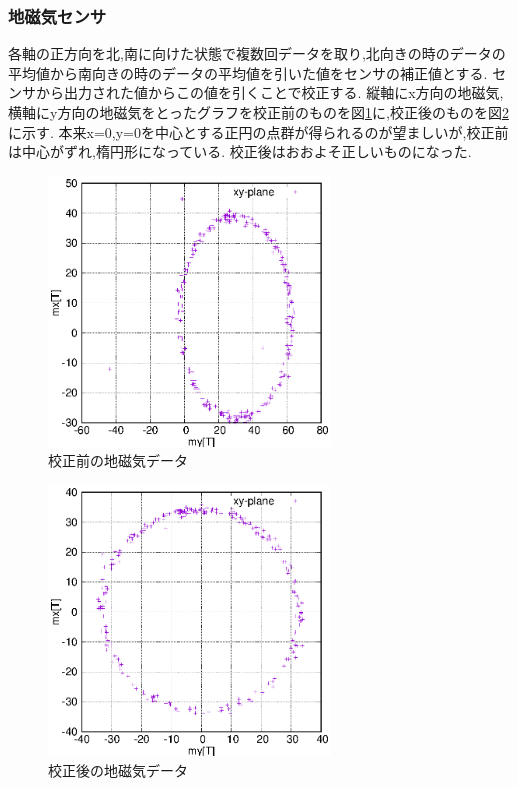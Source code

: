 \documentclass[12pt,oneside]{sotsuken_paper}
\begin{document}
\subsubsection{地磁気センサ}
各軸の正方向を北,南に向けた状態で複数回データを取り,北向きの時のデータの平均値から南向きの時のデータの平均値を引いた値をセンサの補正値とする.
センサから出力された値からこの値を引くことで校正する.
縦軸にx方向の地磁気,横軸にy方向の地磁気をとったグラフを校正前のものを図\ref{fig:mag-calib-be}に,校正後のものを図\ref{fig:mag-calib-af}に示す.
本来x=0,y=0を中心とする正円の点群が得られるのが望ましいが,校正前は中心がずれ,楕円形になっている.
校正後はおおよそ正しいものになった.

\begin{figure}[htbp]
	\begin{center}
		\includegraphics[width=75mm]{image/calibration/mag-calib-be.eps}
		\caption{校正前の地磁気データ}
		\label{fig:mag-calib-be}
	\end{center}
\end{figure}

\begin{figure}[htbp]
	\begin{center}
		\includegraphics[width=75mm]{image/calibration/mag-calib-af.eps}
		\caption{校正後の地磁気データ}
		\label{fig:mag-calib-af}
	\end{center}
\end{figure}
\end{document}
